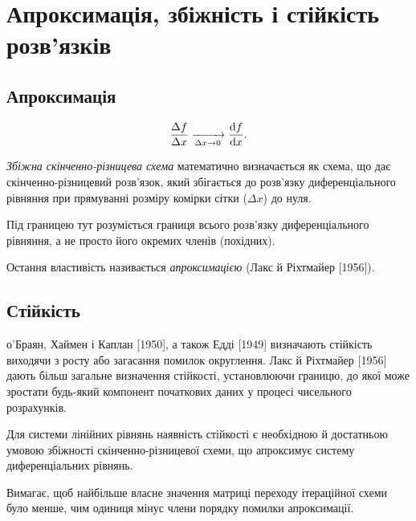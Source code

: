 \section{Апроксимація, збіжність і стійкість розв'язків}

\subsection{Апроксимація}

\begin{equation}
    \dfrac{\Delta f}{\Delta x} \xrightarrow[\Delta x \to 0]{} \dfrac{\mathop{}\!\mathrm{d} f}{\mathop{}\!\mathrm{d} x}.
\end{equation}

\begin{definition}
    \textit{Збіжна скінченно-різницева схема} математично визначається як схема, що дає скінченно-різницевий розв'язок, який збігається до розв'язку диференціального рівняння при прямуванні розміру комірки сітки ($\Delta x$) до нуля.
\end{definition}

\begin{remark}
    Під границею тут розуміється границя всього розв'язку диференціального рівняння, а не просто його окремих членів (похідних). 
\end{remark}

\begin{definition}
    Остання властивість називається \textit{апроксимацією} (Лакс й Ріхтмайер [1956]).
\end{definition}

\subsection{Стійкість}

о'Браян, Хаймен і Каплан [1950], а також Едді [1949] визначають стійкість виходячи з росту або загасання помилок округлення. Лакс й Ріхтмайер [1956] дають більш загальне визначення стійкості, установлюючи границю, до якої може зростати будь-який компонент початкових даних у процесі чисельного розрахунків.

\begin{theorem}[Лакса]
    Для системи лінійних рівнянь наявність стійкості є необхідною й достатньою умовою збіжності скінченно-різницевої схеми, що апроксимує систему диференціальних рівнянь.
\end{theorem}

\begin{theorem}
    Вимагає, щоб найбільше власне значення матриці переходу ітераційної схеми було менше, чим одиниця мінус члени порядку помилки апроксимації.
\end{theorem}

